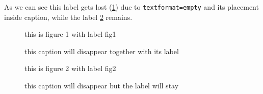 \documentclass{article}
\begin{document}
As we can see this label gets lost (\ref{fig1}) due to \texttt{textformat=empty} and its placement inside caption, while the label \ref{fig2} remains.

\begin{figure}
\caption{this caption will disappear together with its label \label{fig1}}
this is figure 1 with label fig1
\end{figure}

\begin{figure}
\caption{this caption will disappear but the label will stay}
\label{fig2}
this is figure 2 with label fig2
\end{figure}
\end{document}
